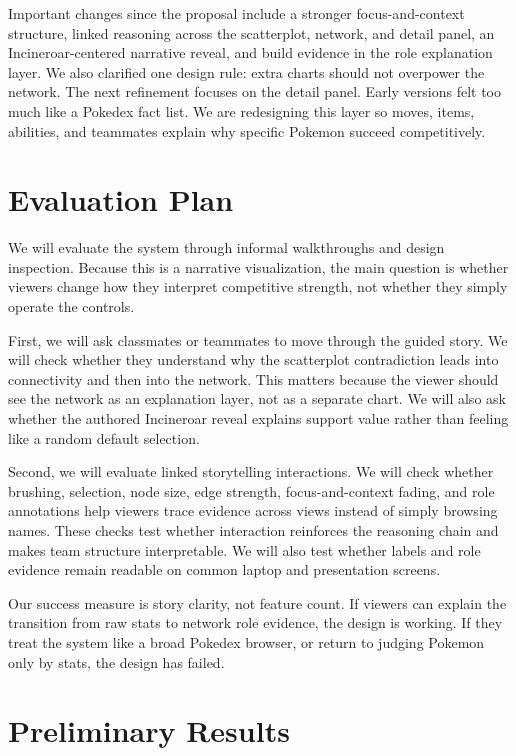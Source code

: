 \documentclass[11pt]{article}
\begin{document}
Important changes since the proposal include a stronger focus-and-context structure, linked reasoning across the scatterplot, network, and detail panel, an Incineroar-centered narrative reveal, and build evidence in the role explanation layer. We also clarified one design rule: extra charts should not overpower the network. The next refinement focuses on the detail panel. Early versions felt too much like a Pokedex fact list. We are redesigning this layer so moves, items, abilities, and teammates explain why specific Pokemon succeed competitively.

\vspace{-0.45em}
\section{Evaluation Plan}

We will evaluate the system through informal walkthroughs and design inspection. Because this is a narrative visualization, the main question is whether viewers change how they interpret competitive strength, not whether they simply operate the controls.

First, we will ask classmates or teammates to move through the guided story. We will check whether they understand why the scatterplot contradiction leads into connectivity and then into the network. This matters because the viewer should see the network as an explanation layer, not as a separate chart. We will also ask whether the authored Incineroar reveal explains support value rather than feeling like a random default selection.

Second, we will evaluate linked storytelling interactions. We will check whether brushing, selection, node size, edge strength, focus-and-context fading, and role annotations help viewers trace evidence across views instead of simply browsing names. These checks test whether interaction reinforces the reasoning chain and makes team structure interpretable. We will also test whether labels and role evidence remain readable on common laptop and presentation screens.

Our success measure is story clarity, not feature count. If viewers can explain the transition from raw stats to network role evidence, the design is working. If they treat the system like a broad Pokedex browser, or return to judging Pokemon only by stats, the design has failed.
\section{Preliminary Results}
\end{document}
